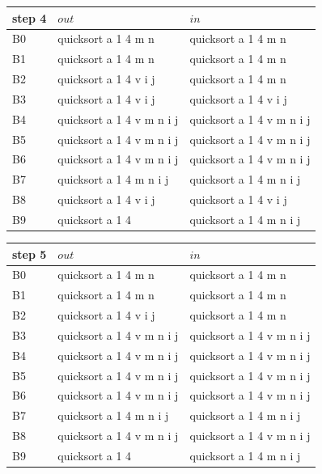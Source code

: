 \begin{tabular}{|l|l|l|} \hline
step 4  & $out$             & $in$      \\ \hline
B0 & quicksort a 1 4 m n       & quicksort a 1 4 m n        \\ \hline
B1 & quicksort a 1 4 m n       & quicksort a 1 4 m n        \\ \hline
B2 & quicksort a 1 4 v i j     & quicksort a 1 4 m n        \\ \hline
B3 & quicksort a 1 4 v i j     & quicksort a 1 4 v i j      \\ \hline
B4 & quicksort a 1 4 v m n i j & quicksort a 1 4 v m n i j  \\ \hline
B5 & quicksort a 1 4 v m n i j & quicksort a 1 4 v m n i j  \\ \hline
B6 & quicksort a 1 4 v m n i j & quicksort a 1 4 v m n i j  \\ \hline
B7 & quicksort a 1 4 m n i j   & quicksort a 1 4 m n i j  \\ \hline
B8 & quicksort a 1 4 v i j     & quicksort a 1 4 v i j  \\ \hline
B9 & quicksort a 1 4           & quicksort a 1 4 m n i j \\ \hline
\end{tabular}

\begin{tabular}{|l|l|l|} \hline
step 5  & $out$             & $in$      \\ \hline
B0 & quicksort a 1 4 m n       & quicksort a 1 4 m n        \\ \hline
B1 & quicksort a 1 4 m n       & quicksort a 1 4 m n        \\ \hline
B2 & quicksort a 1 4 v i j     & quicksort a 1 4 m n        \\ \hline
B3 & quicksort a 1 4 v m n i j & quicksort a 1 4 v m n i j  \\ \hline
B4 & quicksort a 1 4 v m n i j & quicksort a 1 4 v m n i j  \\ \hline
B5 & quicksort a 1 4 v m n i j & quicksort a 1 4 v m n i j  \\ \hline
B6 & quicksort a 1 4 v m n i j & quicksort a 1 4 v m n i j  \\ \hline
B7 & quicksort a 1 4 m n i j   & quicksort a 1 4 m n i j  \\ \hline
B8 & quicksort a 1 4 v m n i j & quicksort a 1 4 v m n i j  \\ \hline
B9 & quicksort a 1 4           & quicksort a 1 4 m n i j \\ \hline
\end{tabular}

